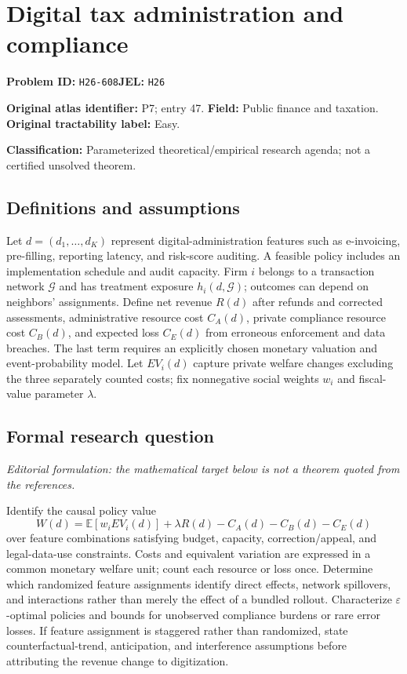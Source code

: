 \documentclass[11pt,a4paper]{article}
\begin{document}
\section*{Digital tax administration and compliance}
\textbf{Problem ID:} \texttt{H26-608}\quad \textbf{JEL:} \texttt{H26}\par
\label{problem:OP-0047}
\label{audited:ECON-089}
\label{atlas:prob:P7}
\noindent\textbf{Original atlas identifier:} P7; entry 47. \textbf{Field:} Public finance and taxation. \textbf{Original tractability label:} Easy.

\noindent\textbf{Classification:} Parameterized theoretical/empirical research agenda; not a certified unsolved theorem.

\subsection*{Definitions and assumptions}
Let $d=(d_1,\ldots,d_K)$ represent digital-administration features such as e-invoicing, pre-filling, reporting latency, and risk-score auditing. A feasible policy includes an implementation schedule and audit capacity. Firm $i$ belongs to a transaction network $\mathcal G$ and has treatment exposure $h_i(d,\mathcal G)$; outcomes can depend on neighbors' assignments. Define net revenue $R(d)$ after refunds and corrected assessments, administrative resource cost $C_A(d)$, private compliance resource cost $C_B(d)$, and expected loss $C_E(d)$ from erroneous enforcement and data breaches. The last term requires an explicitly chosen monetary valuation and event-probability model. Let $EV_i(d)$ capture private welfare changes excluding the three separately counted costs; fix nonnegative social weights $w_i$ and fiscal-value parameter $\lambda$.

\subsection*{Formal research question}
\emph{Editorial formulation: the mathematical target below is not a theorem quoted from the references.}

Identify the causal policy value
\[
 W(d)=\mathbb E[w_iEV_i(d)]+\lambda R(d)-C_A(d)-C_B(d)-C_E(d)
\]
over feature combinations satisfying budget, capacity, correction/appeal, and legal-data-use constraints. Costs and equivalent variation are expressed in a common monetary welfare unit; count each resource or loss once. Determine which randomized feature assignments identify direct effects, network spillovers, and interactions rather than merely the effect of a bundled rollout. Characterize $\varepsilon$-optimal policies and bounds for unobserved compliance burdens or rare error losses. If feature assignment is staggered rather than randomized, state counterfactual-trend, anticipation, and interference assumptions before attributing the revenue change to digitization.
\end{document}
